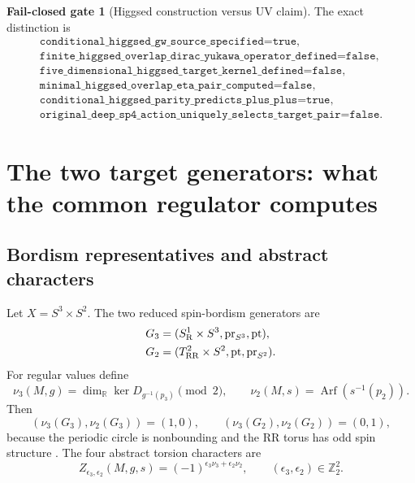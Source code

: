 \documentclass[11pt]{article}
\theoremstyle{definition}
\newtheorem{gate}[theorem]{Fail-closed gate}
\theoremstyle{remark}
\newcommand{\ZZ}{\mathbb Z}
\newcommand{\RR}{\mathbb R}
\newcommand{\Arf}{\operatorname{Arf}}
\begin{document}
\begin{gate}[Higgsed construction versus UV claim]
The exact distinction is
\begin{equation}
 \begin{gathered}
 \texttt{conditional\_higgsed\_gw\_source\_specified=true},\\
 \texttt{finite\_higgsed\_overlap\_dirac\_yukawa\_operator\_defined=false},\\
 \texttt{five\_dimensional\_higgsed\_target\_kernel\_defined=false},\\
 \texttt{minimal\_higgsed\_overlap\_eta\_pair\_computed=false},\\
 \texttt{conditional\_higgsed\_parity\_predicts\_plus\_plus=true},\\
 \texttt{original\_deep\_sp4\_action\_uniquely\_selects\_target\_pair=false}.
 \end{gathered}
 \label{eq:higgsed-lift-gates}
\end{equation}
\end{gate}

\section{The two target generators: what the common regulator computes}

\subsection{Bordism representatives and abstract characters}

Let \(X=S^3\times S^2\).  The two reduced spin-bordism generators are
\begin{align}
 G_3&=(S^1_{\rm R}\times S^3,\operatorname{pr}_{S^3},{\rm pt}),
 \label{eq:G3}\\
 G_2&=(T^2_{\rm RR}\times S^2,{\rm pt},\operatorname{pr}_{S^2}).
 \label{eq:G2}
\end{align}
For regular values define
\begin{equation}
 \nu_3(M,g)=\dim_{\RR}\ker D_{g^{-1}(p_3)}\pmod2,
 \qquad
 \nu_2(M,s)=\Arf(s^{-1}(p_2)).
 \label{eq:target-invariants}
\end{equation}
Then
\begin{equation}
 (\nu_3(G_3),\nu_2(G_3))=(1,0),
 \qquad
 (\nu_3(G_2),\nu_2(G_2))=(0,1),
 \label{eq:generator-invariants}
\end{equation}
because the periodic circle is nonbounding and the RR torus has odd spin
structure \cite{Atiyah1971}.  The four abstract torsion characters are
\begin{equation}
 Z_{\epsilon_3,\epsilon_2}(M,g,s)
 =(-1)^{\epsilon_3\nu_3+\epsilon_2\nu_2},
 \qquad (\epsilon_3,\epsilon_2)\in\ZZ_2^2.
 \label{eq:four-characters}
\end{equation}
\end{document}
